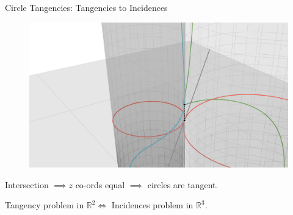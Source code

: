 \documentclass{beamer}
\newcommand{\RR}{\mathbb R}
\newcommand{\nfr}[1]{\begin{frame} #1
\end{frame}}
\begin{document}
\nfr{{Circle Tangencies: Tangencies to Incidences}

\begin{figure}[h]
    \centering
    \includegraphics[width=0.8
    \textwidth, trim={5cm 0 4cm 2cm}, clip=true]{images/Diagram4c.png}
\end{figure}

Intersection  $\implies z$ co-ords equal $\implies$  circles are tangent.

Tangency problem in $\RR^2 \iff $ Incidences problem in $\RR^3$.
}
\end{document}
